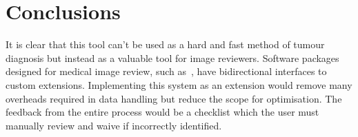 \documentclass[journal]{IEEEtran}
\begin{document}
\section{Conclusions}
\label{sec:conclusions}

It is clear that this tool can't be used as a hard and fast method of tumour diagnosis but instead as a valuable tool for image reviewers.
Software packages designed for medical image review, such as~\cite{slicer}, have bidirectional interfaces to custom extensions.
Implementing this system as an extension would remove many overheads required in data handling but reduce the scope for optimisation.
The feedback from the entire process would be a checklist which the user must manually review and waive if incorrectly identified. 












\end{document}
